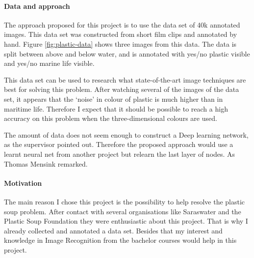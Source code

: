 \documentclass[a4paper, 12pt]{article}
\begin{document}
\paragraph{Data and approach}
The approach proposed for this project is to use the data set of 40k annotated images.
This data set was constructed from short film clips and annotated by hand.
Figure \ref{fig:plastic-data} shows three images from this data.
The data is split between above and below water, and is annotated with yes/no plastic visible and yes/no marine life visible.

This data set can be used to research what state-of-the-art image techniques are best for solving this problem.
After watching several of the images of the data set, it appears that the `noise' in colour of plastic is much higher than in maritime life.
Therefore I expect that it should be possible to reach a high accuracy on this problem when the three-dimensional colours are used.

The amount of data does not seem enough to construct a Deep learning network, as the supervisor pointed out. Therefore the proposed approach would use a learnt neural net from another project but relearn the last layer of nodes. As Thomas Mensink remarked.

\paragraph{Motivation}
The main reason I chose this project is the possibility to help resolve the plastic soup problem.
After contact with several organisations like Saraswater and the Plastic Soup Foundation they were enthusiastic about this project.
That is why I already collected and annotated a data set.
Besides that my interest and knowledge in Image Recognition from the bachelor courses would help in this project.
\end{document}
